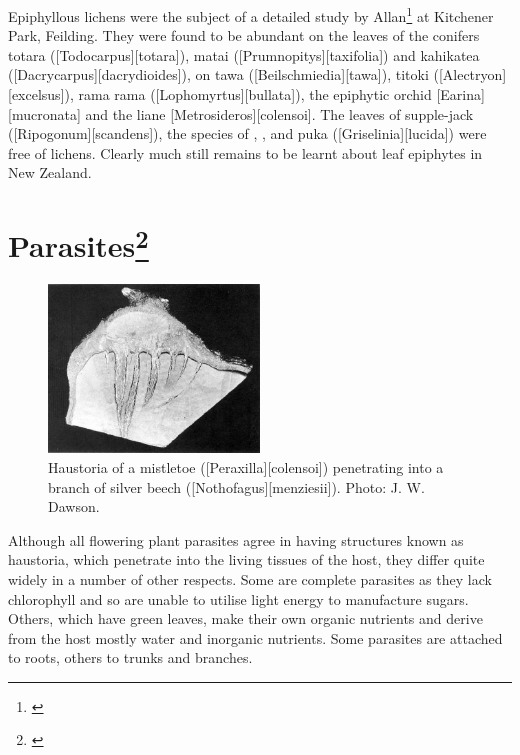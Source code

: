 Epiphyllous lichens were the subject of a detailed study by Allan\footnote{\cite{zahlbruckner1928epiphyllous}} at Kitchener Park, Feilding.
They were found to be abundant on the leaves of the conifers totara ([Todocarpus][totara]), matai ([Prumnopitys][taxifolia]) and kahikatea ([Dacrycarpus][dacrydioides]), on tawa ([Beilschmiedia][tawa]), titoki ([Alectryon][excelsus]), rama rama ([Lophomyrtus][bullata]), the epiphytic orchid [Earina][mucronata] and the liane [Metrosideros][colensoi].
The leaves of supple-jack ([Ripogonum][scandens]), the species of , ,  and puka ([Griselinia][lucida]) were free of lichens.
Clearly much still remains to be learnt about leaf epiphytes in New Zealand.

\section[Parasites]{Parasites\thinspace\footnote{\cite{fineran1974parasitic}}}

\begin{figure}
	\includegraphics[width=0.5\textwidth]{graphics/figure57mistletoe-haustoria.jpg}
	\centering
	\caption[Haustoria of a mistletoe]{Haustoria of a mistletoe ([Peraxilla][colensoi]) penetrating into a branch of silver beech ([Nothofagus][menziesii]).
	Photo: J. W. Dawson.}%
	\label{fig:57mistletoe-haustori}
\end{figure}

Although all flowering plant parasites agree in having structures known as haustoria, which penetrate into the living tissues of the host, they differ quite widely in a number of other respects.
Some are complete parasites as they lack chlorophyll and so are unable to utilise light energy to manufacture sugars.
Others, which have green leaves, make their own organic nutrients and derive from the host mostly water and inorganic nutrients.
Some parasites are attached to roots, others to trunks and branches.

